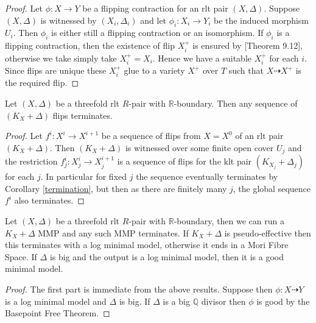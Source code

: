 \documentclass[a4paper,12pt]{amsart}
\begin{document}
	\begin{proof}
	Let $\phi:X \to Y$ be a flipping contraction for an rlt pair $(X,\Delta)$. Suppose $(X,\Delta)$ is witnessed by $(X_{i},\Delta_{i})$ and let $\phi_{i}:X_{i} \to Y_{i}$ be the induced morphism $U_{i}$. Then $\phi_{i}$ is either still a flipping contraction or an isomorphism. If $\phi_{i}$ is a flipping contraction, then the existence of flip $X_{i}^{+}$ is ensured by \cite{bhatt2020globally+}[Theorem 9.12], otherwise we take simply take $X_{i}^{+}=X_{i}$. Hence we have a suitable $X_{i}^{+}$ for each $i$. Since flips are unique these $X_{i}^{+}$ glue to a variety $X^{+}$ over $T$ such that $X \dashrightarrow X^{+}$ is the required flip.
	\end{proof}
	
	\begin{theorem}
		Let $(X,\Delta)$ be a threefold rlt $R$-pair with $\mathbb{R}$-boundary. Then any sequence of $(K_{X}+\Delta)$ flips terminates.
	\end{theorem}
	
	\begin{proof}
		Let $f^{i}:X^{i} \to X^{i+1}$ be a sequence of flips from $X=X^{0}$ of an rlt pair $(K_{X}+\Delta)$. Then $(K_{X}+\Delta)$ is witnessed over some finite open cover $U_{j}$ and the restriction $f^{i}_{j}:X_{j}^{i} \to X_{j}^{i+1}$ is a sequence of flips for the klt pair $(K_{X_{j}}+\Delta_{j})$ for each $j$. In particular for fixed $j$ the sequence eventually terminates by Corollary \ref{termination}, but then as there are finitely many $j$, the global sequence $f^{i}$ also terminates. 
	\end{proof}

\begin{theorem}\label{rltmmp}
	Let $(X,\Delta)$ be a threefold rlt $R$-pair with $\mathbb{R}$-boundary, then we can run a $K_{X}+\Delta$ MMP and any such MMP terminates. If $K_{X}+\Delta$ is pseudo-effective then this terminates with a log minimal model, otherwise it ends in a Mori Fibre Space. If $\Delta$ is big and the output is a log minimal model, then it is a good minimal model.
\end{theorem}


\begin{proof}
	The first part is immediate from the above results. Suppose then $\phi:X \dashrightarrow Y$ is a log minimal model and $\Delta$ is big. If $\Delta$ is a big $\mathbb{Q}$ divisor then $\phi$ is good by the Basepoint Free Theorem. 
\end{proof}
\end{document}
